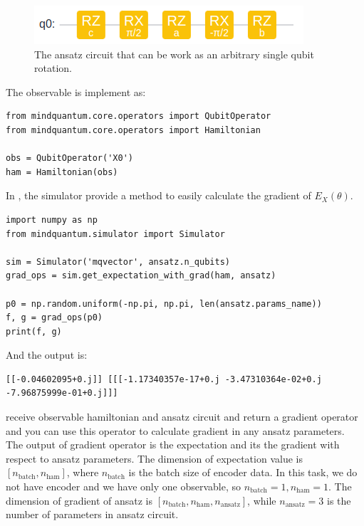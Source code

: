 \begin{figure}[h]
  \begin{center}
    \includegraphics[width=0.9\linewidth]{images/3_1_ansatz.png}
  \end{center}
  \caption{The ansatz circuit that can be work as an arbitrary single qubit rotation.}
  \label{fig:u3_ansatz}
\end{figure}

The observable is implement as:

\begin{lstlisting}
from mindquantum.core.operators import QubitOperator
from mindquantum.core.operators import Hamiltonian

obs = QubitOperator('X0')
ham = Hamiltonian(obs)
\end{lstlisting}

In \MindQuantum, the simulator provide a method to easily calculate the gradient of $E_X(\theta)$.

\begin{lstlisting}
import numpy as np
from mindquantum.simulator import Simulator

sim = Simulator('mqvector', ansatz.n_qubits)
grad_ops = sim.get_expectation_with_grad(ham, ansatz)

p0 = np.random.uniform(-np.pi, np.pi, len(ansatz.params_name))
f, g = grad_ops(p0)
print(f, g)
\end{lstlisting}
And the output is:
\begin{lstlisting}
[[-0.04602095+0.j]] [[[-1.17340357e-17+0.j -3.47310364e-02+0.j -7.96875999e-01+0.j]]]
\end{lstlisting}

\getexpectationwithgrad receive observable hamiltonian and ansatz circuit and return a gradient operator and you can use this operator to calculate gradient in any ansatz parameters. The output of gradient operator is the expectation and its the gradient with respect to ansatz parameters. The dimension of expectation value is $[n_\text{batch}, n_\text{ham}]$, where $n_\text{batch}$ is the batch size of encoder data. In this task, we do not have encoder and we have only one observable, so $n_\text{batch}=1, n_\text{ham}=1$. The dimension of gradient of ansatz is $[n_\text{batch}, n_\text{ham}, n_\text{ansatz}]$, while $n_\text{ansatz} = 3$ is the number of parameters in ansatz circuit.

